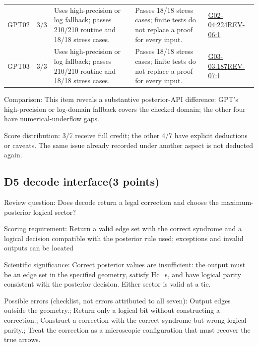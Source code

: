 \documentclass[11pt,a4paper]{article}
\begin{document}
{\begin{longtable}
{}GPT02 & 3/\allowbreak{}3 & Uses high-precision or log fallback; passes 210/\allowbreak{}210 routine and 18/\allowbreak{}18 stress cases. & Passes 18/\allowbreak{}18 stress cases; finite tests do not replace a proof for every input. & \hyperref[src:G02-04]{G02-04:224}\newline \hyperref[src:REV-06]{REV-06:1}\tabularnewline
{}GPT03 & 3/\allowbreak{}3 & Uses high-precision or log fallback; passes 210/\allowbreak{}210 routine and 18/\allowbreak{}18 stress cases. & Passes 18/\allowbreak{}18 stress cases; finite tests do not replace a proof for every input. & \hyperref[src:G03-03]{G03-03:187}\newline \hyperref[src:REV-07]{REV-07:1}\tabularnewline
\bottomrule
\end{longtable}
}
Comparison: This item reveals a substantive posterior-API difference: GPT's high-precision or log-domain fallback covers the checked domain; the other four have numerical-underflow gaps.

Score distribution: 3/\allowbreak{}7 receive full credit; the other 4/\allowbreak{}7 have explicit deductions or caveats. The same issue already recorded under another aspect is not deducted again.

\clearpage
\subsection{D5 decode interface(3 points)}
\label{aspect:D5}
Review question: Does decode return a legal correction and choose the maximum-posterior logical sector?

Scoring requirement: Return a valid edge set with the correct syndrome and a logical decision compatible with the posterior rule used; exceptions and invalid outputs can be located

Scientific significance: Correct posterior values are insufficient: the output must be an edge set in the specified geometry,\allowbreak{} satisfy Hc=s,\allowbreak{} and have logical parity consistent with the posterior decision. Either sector is valid at a tie.

Possible errors (checklist,\allowbreak{} not errors attributed to all seven): Output edges outside the geometry.; Return only a logical bit without constructing a correction.; Construct a correction with the correct syndrome but wrong logical parity.; Treat the correction as a microscopic configuration that must recover the true arrows.
\end{document}
